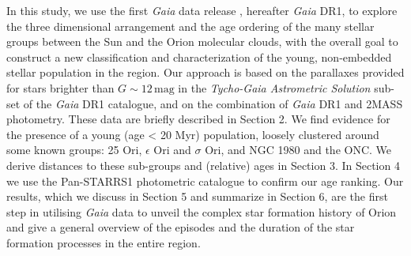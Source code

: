 \documentclass[twocolumn]{aa}
\begin{document}
In this study, we use the first \textit{Gaia} data release \citep{Brown2016, Prusti2016}, hereafter \textit{Gaia} DR1, to explore the three dimensional arrangement and the age ordering of the many stellar groups between the Sun and the Orion molecular clouds,
with the overall goal to construct a new classification and characterization of the young, non-embedded stellar population in the region.  
Our approach is based on the parallaxes provided for stars brighter than $G \sim 12 \, \mathrm{mag}$ in the \textit{Tycho-Gaia Astrometric Solution} \citep[TGAS][]{Michalik2015, Lindegren2016} sub-set of the \textit{Gaia} DR1 catalogue, and on the combination of \textit{Gaia} DR1 and 2MASS photometry. These data are briefly described in Section 2. 
We find evidence for the presence of a young (age < 20 Myr) population, loosely clustered around some known groups: 25 Ori, $\epsilon$ Ori and $\sigma$ Ori, and NGC 1980 and the ONC. We derive distances to these sub-groups and (relative) ages in Section 3. In Section 4 we use the Pan-STARRS1 photometric catalogue \citep{Chambers2016}  to confirm our age ranking. 
Our results, which we discuss in Section 5 and summarize in Section 6, are the first step in utilising \textit{Gaia} data to unveil the complex star formation history of Orion and give a general overview of the episodes and the duration of the star formation processes in the entire region.
\end{document}

